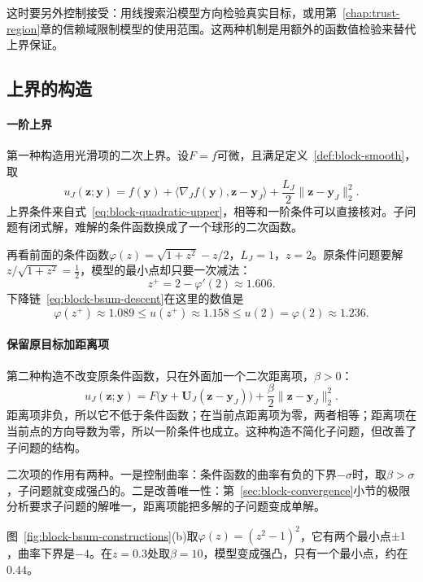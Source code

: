 这时要另外控制接受：用线搜索沿模型方向检验真实目标，或用第~\ref{chap:trust-region}章的信赖域限制模型的使用范围。这两种机制是用额外的函数值检验来替代上界保证。

\subsection{上界的构造}
\label{sec:block-bsum-construction}

\paragraph{一阶上界}
第一种构造用光滑项的二次上界。设$F=f$可微，且满足定义~\ref{def:block-smooth}，取
\begin{equation}
 u_J(\bm{z};\bm{y})=f(\bm{y})+\langle\nabla_Jf(\bm{y}),\bm{z}-\bm{y}_J\rangle+\frac{L_J}{2}\lVert\bm{z}-\bm{y}_J\rVert_2^2 .
 \label{eq:block-ub-quadratic}
\end{equation}
上界条件来自式~\eqref{eq:block-quadratic-upper}，相等和一阶条件可以直接核对。子问题有闭式解，难解的条件函数换成了一个球形的二次函数。

再看前面的条件函数$\varphi(z)=\sqrt{1+z^2}-z/2$，$L_J=1$，$z=2$。原条件问题要解$z/\sqrt{1+z^2}=\tfrac12$，模型的最小点却只要一次减法：
\[
 z^{+}=2-\varphi'(2)\approx1.606 .
\]
下降链~\eqref{eq:block-bsum-descent}在这里的数值是
\[
 \varphi(z^{+})\approx1.089\leq u(z^{+})\approx1.158\leq u(2)=\varphi(2)\approx1.236 .
\]

\paragraph{保留原目标加距离项}
第二种构造不改变原条件函数，只在外面加一个二次距离项，$\beta>0$：
\begin{equation}
 u_J(\bm{z};\bm{y})=F\bigl(\bm{y}+\bm{U}_J(\bm{z}-\bm{y}_J)\bigr)+\frac{\beta}{2}\lVert\bm{z}-\bm{y}_J\rVert_2^2 .
 \label{eq:block-ub-proximal}
\end{equation}
距离项非负，所以它不低于条件函数；在当前点距离项为零，两者相等；距离项在当前点的方向导数为零，所以一阶条件也成立。这种构造不简化子问题，但改善了子问题的结构。

二次项的作用有两种。一是控制曲率：条件函数的曲率有负的下界$-\sigma$时，取$\beta>\sigma$，子问题就变成强凸的。二是改善唯一性：第~\ref{sec:block-convergence}小节的极限分析要求子问题的解唯一，距离项能把多解的子问题变成单解。

图~\ref{fig:block-bsum-constructions}(b)取$\varphi(z)=(z^2-1)^2$，它有两个最小点$\pm1$，曲率下界是$-4$。在$z=0.3$处取$\beta=10$，模型变成强凸，只有一个最小点，约在$0.44$。

